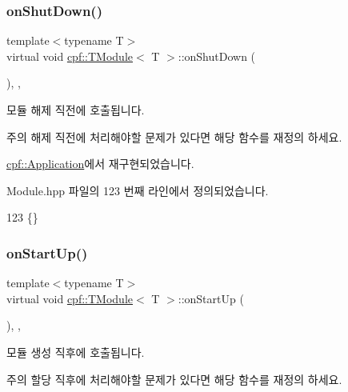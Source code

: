 \subsubsection{\texorpdfstring{on\+Shut\+Down()}{onShutDown()}}
{\footnotesize\ttfamily template$<$typename T$>$ \\
virtual void \hyperlink{classcpf_1_1_t_module}{cpf\+::\+T\+Module}$<$ T $>$\+::on\+Shut\+Down (\begin{DoxyParamCaption}{ }\end{DoxyParamCaption})\hspace{0.3cm}{\ttfamily [inline]}, {\ttfamily [protected]}, {\ttfamily [virtual]}}

모듈 해제 직전에 호출됩니다. \begin{DoxyNote}{주의}
해제 직전에 처리해야할 문제가 있다면 해당 함수를 재정의 하세요. 
\end{DoxyNote}


\hyperlink{classcpf_1_1_application_afa25d5eb462d3d5b1ce19c6d217fe9e7}{cpf\+::\+Application}에서 재구현되었습니다.



Module.\+hpp 파일의 123 번째 라인에서 정의되었습니다.


\begin{DoxyCode}
123 \{\}
\end{DoxyCode}
\mbox{\label{classcpf_1_1_t_module_a4eb83b0848794e422d2d345439f51a04}} 
\subsubsection{\texorpdfstring{on\+Start\+Up()}{onStartUp()}}
{\footnotesize\ttfamily template$<$typename T$>$ \\
virtual void \hyperlink{classcpf_1_1_t_module}{cpf\+::\+T\+Module}$<$ T $>$\+::on\+Start\+Up (\begin{DoxyParamCaption}{ }\end{DoxyParamCaption})\hspace{0.3cm}{\ttfamily [inline]}, {\ttfamily [protected]}, {\ttfamily [virtual]}}

모듈 생성 직후에 호출됩니다. \begin{DoxyNote}{주의}
할당 직후에 처리해야할 문제가 있다면 해당 함수를 재정의 하세요. 
\end{DoxyNote}


